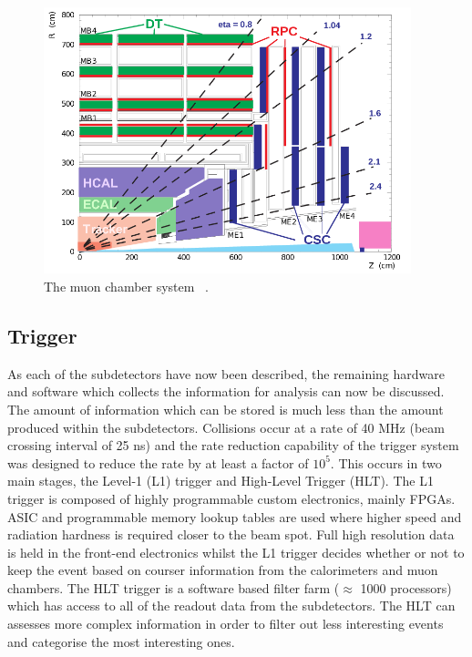 \begin{figure}[ht!]
\centering
    \includegraphics[width=0.95\textwidth]{images/MuonChambers.png}
    \caption{The muon chamber system ~\cite{Kim:2012ix}.}
    \label{fig:muonchamber}
\end{figure}

\subsection{Trigger \label{det:trigger}}
As each of the subdetectors have now been described, the remaining hardware and software which collects the information for analysis can now be discussed. The amount of information which can be stored is much less than the amount produced within the subdetectors. Collisions occur at a rate of 40 MHz (beam crossing interval of 25 ns) and the rate reduction capability of the trigger system was designed to reduce the rate by at least a factor of $10^5$. This occurs in two main stages, the Level-1 (L1) trigger and High-Level Trigger (HLT). The L1 trigger is composed of highly programmable custom electronics, mainly FPGAs. ASIC and programmable memory lookup tables are used where higher speed and radiation hardness is required closer to the beam spot. Full high resolution data is held in the front-end electronics whilst the L1 trigger decides whether or not to keep the event based on courser information from the calorimeters and muon chambers. The HLT trigger is a software based filter farm ($\approx$ 1000 processors) which has access to all of the readout data from the subdetectors. The HLT can assesses more complex information in order to filter out less interesting events and categorise the most interesting ones. 

